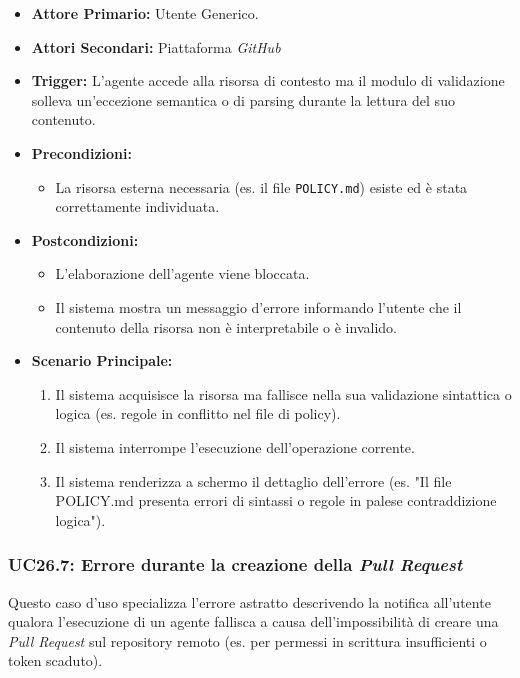 \documentclass[12pt, a4paper]{article}
\begin{document}
\begin{itemize}
    \item \textbf{Attore Primario:} Utente Generico.
    \item \textbf{Attori Secondari:} Piattaforma \textit{GitHub}
    \item \textbf{Trigger:} L'agente accede alla risorsa di contesto ma il modulo di validazione solleva un'eccezione semantica o di parsing durante la lettura del suo contenuto.
    \item \textbf{Precondizioni:}
    \begin{itemize}
        \item La risorsa esterna necessaria (es. il file \texttt{POLICY.md}) esiste ed è stata correttamente individuata.
    \end{itemize}
    \item \textbf{Postcondizioni:}
    \begin{itemize}
        \item L'elaborazione dell'agente viene bloccata.
        \item Il sistema mostra un messaggio d'errore informando l'utente che il contenuto della risorsa non è interpretabile o è invalido.
    \end{itemize}
    \item \textbf{Scenario Principale:}
    \begin{enumerate}
        \item Il sistema acquisisce la risorsa ma fallisce nella sua validazione sintattica o logica (es. regole in conflitto nel file di policy).
        \item Il sistema interrompe l'esecuzione dell'operazione corrente.
        \item Il sistema renderizza a schermo il dettaglio dell'errore (es. "Il file POLICY.md presenta errori di sintassi o regole in palese contraddizione logica").
    \end{enumerate}
\end{itemize}

\subsubsection{UC26.7: Errore durante la creazione della \textit{Pull Request}}\label{uc:26.7}
Questo caso d'uso specializza l'errore astratto descrivendo la notifica all'utente qualora l'esecuzione di un agente fallisca a causa dell'impossibilità di creare una \textit{Pull Request} sul repository remoto (es. per permessi in scrittura insufficienti o token scaduto).
\end{document}
